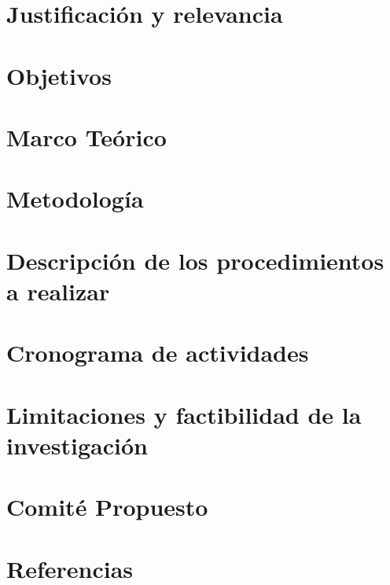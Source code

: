 \documentclass[10pt,letterpaper]{report}
\begin{document}
\chapter{Justificación y relevancia}

\chapter{Objetivos}

\chapter{Marco Teórico}

\chapter{Metodología}

\chapter{Descripción de los procedimientos a realizar}

\chapter{Cronograma de actividades}

\chapter{Limitaciones y factibilidad de la investigación}

\chapter{Comité Propuesto}

\chapter*{Referencias}
\printbibliography[title={Referencias}]
\end{document}
